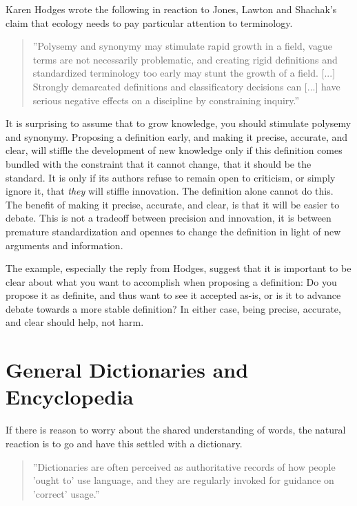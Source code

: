 \documentclass[graybox,envcountchap,sectrefs]{svmono}
\begin{document}
Karen Hodges wrote the following in reaction to Jones, Lawton and Shachak's claim that ecology needs to pay particular attention to terminology.

\begin{quote}
''Polysemy and synonymy may stimulate rapid growth in a field, vague terms are not necessarily problematic, and creating rigid definitions and standardized terminology too early may stunt the growth of a field. [...] Strongly demarcated definitions and classificatory decisions can [...] have serious negative effects on a discipline by constraining inquiry.'' \cite{hodges2008defining}
\end{quote}

It is surprising to assume that to grow knowledge, you should stimulate polysemy and synonymy. Proposing a definition early, and making it precise, accurate, and clear, will stiffle the development of new knowledge only if this definition comes bundled with the constraint that it cannot change, that it should be the standard. It is only if its authors refuse to remain open to criticism, or simply ignore it, that \textit{they} will stiffle innovation. The definition alone cannot do this. The benefit of making it precise, accurate, and clear, is that it will be easier to debate. This is not a tradeoff between precision and innovation, it is between premature standardization and opennes to change the definition in light of new arguments and information. 

The example, especially the reply from Hodges, suggest that it is important to be clear about what you want to accomplish when proposing a definition: Do you propose it as definite, and thus want to see it accepted as-is, or is it to advance debate towards a more stable definition? In either case, being precise, accurate, and clear should help, not harm.


\section{General Dictionaries and Encyclopedia}
If there is reason to worry about the shared understanding of words, the natural reaction is to go and have this settled with a dictionary. 

\begin{quote}
''Dictionaries are often perceived as authoritative records of how people 'ought to' use language, and they are regularly invoked for guidance on 'correct' usage.'' \cite{atkins2008oxford}
\end{quote}
\end{document}
